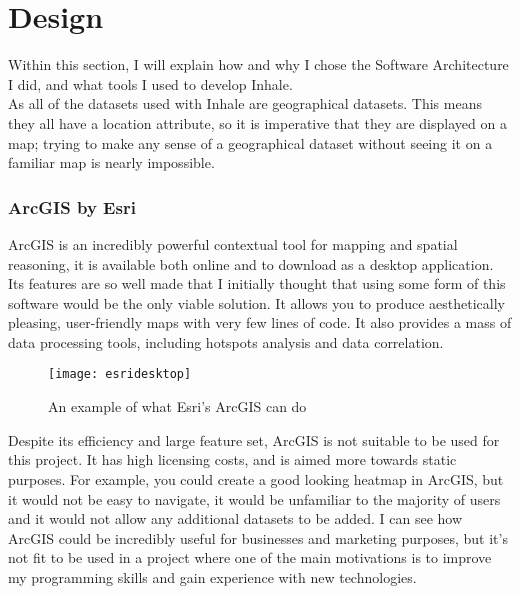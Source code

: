 \chapter{Design}
Within this section, I will explain how and why I chose the Software Architecture I did, and what tools I used to develop Inhale.\\

As all of the datasets used with Inhale are geographical datasets. This means they all have a location attribute, so it is imperative that they are displayed on a map; trying to make any sense of a geographical dataset without seeing it on a familiar map is nearly impossible.\\

\subsection{ArcGIS by Esri}

ArcGIS is an incredibly powerful contextual tool for mapping and spatial reasoning, it is available both online and to download as a desktop application. Its features are so well made that I initially thought that using some form of this software would be the only viable solution. It allows you to produce aesthetically pleasing, user-friendly maps with very few lines of code. It also provides a mass of data processing tools, including hotspots analysis and data correlation.\\

\begin{figure}[H]
\begin{center}
\texttt{[image: esridesktop]}
\label{fig:esri}
\caption{An example of what Esri's ArcGIS can do \cite{esridesktop}}
\end{center}
\end{figure}

Despite its efficiency and large feature set, ArcGIS is not suitable to be used for this project. It has high licensing costs, and is aimed more towards static purposes. For example, you could create a good looking heatmap in ArcGIS, but it would not be easy to navigate, it would be unfamiliar to the majority of users and it would not allow any additional datasets to be added. I can see how ArcGIS could be incredibly useful for businesses and marketing purposes, but it's not fit to be used in a project where one of the main motivations is to improve my programming skills and gain experience with new technologies.\\


